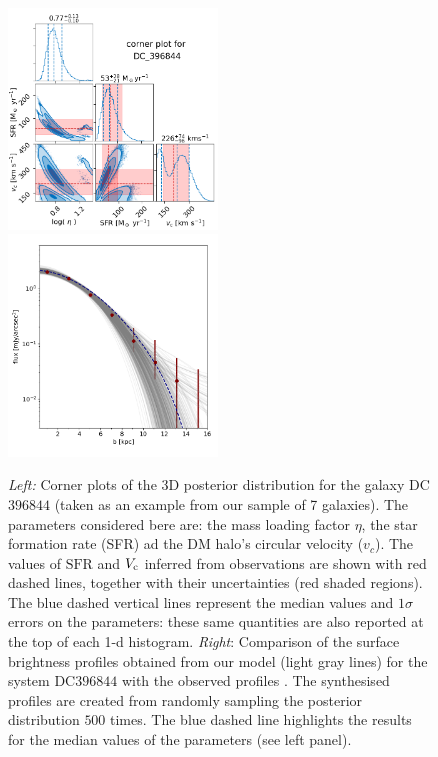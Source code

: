 \documentclass[a4paper, 12pt]{article}
\begin{document}
\begin{figure}
	\centering
	\includegraphics[width=0.495\textwidth]{plots/corner.png}
	\includegraphics[width=0.495\textwidth]{plots/emission_final_single.png}
	\caption{\textit{Left:}
	Corner plots of the 3D posterior distribution for the galaxy DC$396844$ (taken as an example from our sample of 7 galaxies). The parameters considered bere are: the mass loading factor $\eta$, the star formation rate (SFR) ad the DM halo's circular velocity ($v_c$).
	The values of $\mathrm{SFR}$ and $V_{\rm c}$ inferred from observations are shown with red dashed lines, together with their uncertainties (red shaded regions). The blue dashed vertical lines represent the median values and $1\sigma$ errors on the parameters: these same quantities are also reported at the top of each 1-d histogram.
	\textit{Right}: Comparison of the \CII surface brightness profiles obtained from our model (light gray lines) for the system DC$396844$ with the observed profiles \citep[][red points]{Fujimoto:2020qzo}. The synthesised profiles are created from randomly sampling the posterior distribution $500$ times. The blue dashed line highlights the results for the median values of the parameters (see left panel).
	    \label{fig:corner}
	}
\end{figure}
\end{document}
